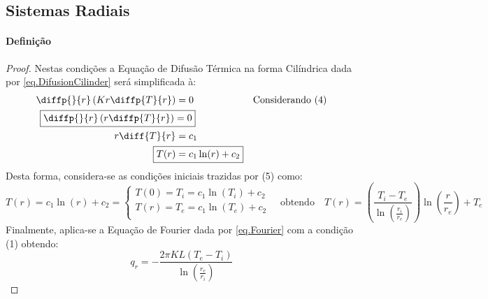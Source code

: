 \documentclass{article}
\begin{document}
        \subsection{Sistemas Radiais}
            \paragraph{Definição}
                \begin{proof}
                    Nestas condições a Equação de Difusão Térmica na forma Cilíndrica dada por \ref{eq.DifusionCilinder} será simplificada à:
                        \begin{align*}
                            \diffp{}{r}\left(Kr\diffp{T}{r}\right) &= 0 & \text{Considerando (4)}\\
                            \Aboxed{\diffp{}{r}\left(r\diffp{T}{r}\right) &= 0}\\
                            r\diff{T}{r} &= c_{1}\\
                            \Aboxed{T(r) &= c_{1}\ln(r) + c_{2}}\\
                        \end{align*}
                    Desta forma, considera-se as condições iniciais trazidas por (5) como:
                        \begin{equation*}
                            T(r) = c_{1}\ln(r) + c_{2} = 
                            \begin{cases}
                                T(0) = T_{i} = c_{1}\ln(T_{i}) + c_{2}\\
                                T(r) = T_{e} = c_{1}\ln(T_{e}) + c_{2}\\
                            \end{cases}
                            \quad
                            \text{obtendo}
                            \quad
                            \boxed{
                                T(r) = 
                                \left(\frac{T_{i} - T_{e}}{\ln\left(\frac{r_{i}}{r_{e}}\right)}\right)
                                \ln\left(\frac{r}{r_{e}}\right) + T_{e}
                            }
                        \end{equation*}
                    Finalmente, aplica-se a Equação de Fourier dada por \ref{eq.Fourier} com a condição (1) obtendo:
                        \begin{equation*}
                            \boxed{q_{r} = -\frac{2\pi KL(T_{e} - T_{i})}{\ln\left(\frac{r_{e}}{r_{i}}\right)}}
                        \end{equation*}
                \end{proof}
\end{document}
